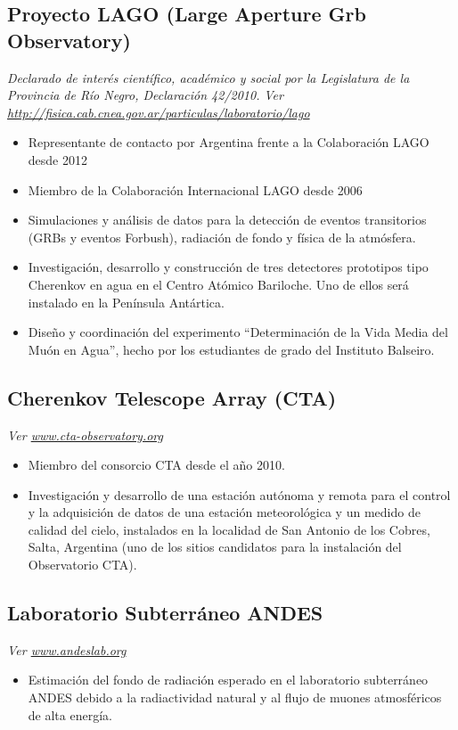 \subsection*{Proyecto LAGO (Large Aperture Grb Observatory)}
{\emph{Declarado de interés científico, académico y social por la Legislatura de la
Provincia de Río Negro, Declaración 42/2010.}}
{\small{\textit{Ver \href{http://fisica.cab.cnea.gov.ar/particulas/laboratorio/lago}{http://fisica.cab.cnea.gov.ar/particulas/laboratorio/lago}}}}\\
\begin{itemize}
\item Representante de contacto por Argentina frente a la Colaboración LAGO desde 2012
\item Miembro de la Colaboración Internacional LAGO desde 2006
\item Simulaciones y análisis de datos para la detección de eventos transitorios (GRBs y eventos Forbush), radiación de fondo y física de la atmósfera.
\item Investigación, desarrollo y construcción de tres detectores prototipos tipo Cherenkov en agua en el Centro Atómico Bariloche. Uno de ellos será instalado en la Península Antártica. 
\item Diseño y coordinación del experimento ``Determinación de la Vida Media del Muón en Agua'', hecho por los estudiantes de grado del Instituto Balseiro.
\end{itemize}

\subsection*{Cherenkov Telescope Array (CTA)}
{\small{\textit{Ver \href{http://www.cta-observatory.org}{www.cta-observatory.org}}}}
\begin{itemize}
\item Miembro del consorcio CTA desde el año 2010.
\item Investigación y desarrollo de una estación autónoma y remota para el control y la adquisición de datos de una estación meteorológica y un medido de calidad del cielo, instalados en la localidad de San Antonio de los Cobres, Salta, Argentina (uno de los sitios candidatos para la instalación del Observatorio CTA).
\end{itemize}

\subsection*{Laboratorio Subterráneo ANDES}
{\small{\textit{Ver \href{http://www.andeslab.org}{www.andeslab.org}}}}
\begin{itemize}
\item Estimación del fondo de radiación esperado en el laboratorio subterráneo ANDES debido a la radiactividad natural y al flujo de muones atmosféricos de alta energía.
\end{itemize}

